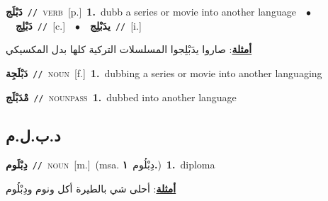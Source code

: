 \documentclass[10pt,a4paper,twoside]{article} %
\begin{document}
\begin{multicols}{2}
{\setlength\topsep{0pt}\textbf{\foreignlanguage{arabic}{دَبْلَج}}\ {\color{gray}\texttt{//}\color{black}}\ \textsc{verb}\ [p.]\ \textbf{1.}~dubb a series or movie into another language\ \ $\bullet$\ \ \setlength\topsep{0pt}\textbf{\foreignlanguage{arabic}{دَبْلِج}}\ {\color{gray}\texttt{//}\color{black}}\ [c.]\ \ $\bullet$\ \ \setlength\topsep{0pt}\textbf{\foreignlanguage{arabic}{يدَبْلِج}}\ {\color{gray}\texttt{//}\color{black}}\ [i.]\  \begin{flushright}\color{gray}\foreignlanguage{arabic}{\textbf{\underline{\foreignlanguage{arabic}{أمثلة}}}: صاروا يدَبْلِجوا المسلسلات التركية كلها بدل المكسيكي}\end{flushright}\color{black}} \vspace{2mm}

{\setlength\topsep{0pt}\textbf{\foreignlanguage{arabic}{دَبْلَجِة}}\ {\color{gray}\texttt{//}\color{black}}\ \textsc{noun}\ [f.]\ \textbf{1.}~dubbing a series or movie into another languaging\ } \vspace{2mm}

{\setlength\topsep{0pt}\textbf{\foreignlanguage{arabic}{مْدَبْلَج}}\ {\color{gray}\texttt{//}\color{black}}\ \textsc{noun\textunderscore pass}\ \textbf{1.}~dubbed into another language\ } \vspace{2mm}

\vspace{-3mm}
\subsection*{\color{blue}\foreignlanguage{arabic}{د.ب.ل.م}\color{blue}{ (ntws)}} 

{\setlength\topsep{0pt}\textbf{\foreignlanguage{arabic}{دِبْلَوم}}\ {\color{gray}\texttt{//}\color{black}}\ \textsc{noun}\ [m.]\ \color{gray}(msa. \foreignlanguage{arabic}{دِبْلُوم}~\foreignlanguage{arabic}{\textbf{١.}})\color{black}\ \textbf{1.}~diploma\  \begin{flushright}\color{gray}\foreignlanguage{arabic}{\textbf{\underline{\foreignlanguage{arabic}{أمثلة}}}: أحلى شي بالطيرة أكل ونوم ودِبْلُوم}\end{flushright}\color{black}} \vspace{2mm}


\end{multicols}
\end{document}
